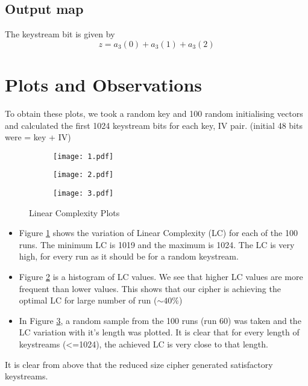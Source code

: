 \documentclass[a4paper,10pt]{article}
\begin{document}
\subsection{Output map}
The keystream bit is given by
\begin{equation}
    z = a_{3}(0) + a_{3}(1) + a_{3}(2)
\end{equation}
\clearpage
\section{Plots and Observations}
To obtain these plots, we took a random key and 100 random initialising vectors and calculated the first 1024 keystream bits for each key, IV pair. (initial 48 bits were = key + IV)
\begin{figure}[H]
    \centering
    \begin{subfigure}{0.7\linewidth}
        \centering
        \texttt{[image: 1.pdf]}
        \caption{}
        \label{fig:1}
    \end{subfigure}
    \begin{subfigure}{0.48\linewidth}
        \centering
        \texttt{[image: 2.pdf]}
        \caption{}
        \label{fig:2}
    \end{subfigure}
    \begin{subfigure}{0.48\linewidth}
        \centering
        \texttt{[image: 3.pdf]}
        \caption{}
        \label{fig:3}
    \end{subfigure}
    \caption{Linear Complexity Plots}
    \label{fig:Q3}
\end{figure}
\begin{itemize}
    \item Figure \ref{fig:1} shows the variation of Linear Complexity (LC) for each of the 100 runs. The minimum LC is 1019 and the maximum is 1024. The LC is very high, for every run as it should be for a random keystream.
    \item Figure \ref{fig:2} is a histogram of LC values. We see that higher LC values are more frequent than lower values. This shows that our cipher is achieving the optimal LC for large number of run ($\sim 40\%$)
    \item In Figure \ref{fig:3}, a random sample from the 100 runs (run 60) was taken and the LC variation with it's length was plotted. It is clear that for every length of keystreams (<=1024), the achieved LC is very close to that length.
\end{itemize}
It is clear from above that the reduced size cipher generated satisfactory keystreams.
\clearpage
\end{document}
